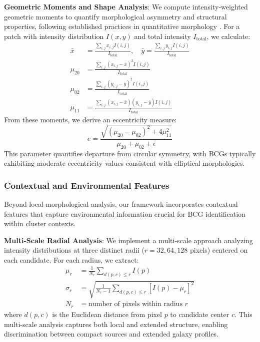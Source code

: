 \documentclass[twocolumn,10pt]{aastex631}
\begin{document}
\textbf{Geometric Moments and Shape Analysis}: We compute intensity-weighted geometric moments to quantify morphological asymmetry and structural properties, following established practices in quantitative morphology \citep{Hambleton2011}. For a patch with intensity distribution $I(x,y)$ and total intensity $I_{\text{total}}$, we calculate:
\begin{align}
\bar{x} &= \frac{\sum_{i,j} x_{i,j} I(i,j)}{I_{\text{total}}}, \quad \bar{y} = \frac{\sum_{i,j} y_{i,j} I(i,j)}{I_{\text{total}}} \\
\mu_{20} &= \frac{\sum_{i,j} (x_{i,j} - \bar{x})^2 I(i,j)}{I_{\text{total}}} \\
\mu_{02} &= \frac{\sum_{i,j} (y_{i,j} - \bar{y})^2 I(i,j)}{I_{\text{total}}} \\
\mu_{11} &= \frac{\sum_{i,j} (x_{i,j} - \bar{x})(y_{i,j} - \bar{y}) I(i,j)}{I_{\text{total}}}
\end{align}
From these moments, we derive an eccentricity measure:
\begin{equation}
e = \frac{\sqrt{(\mu_{20} - \mu_{02})^2 + 4\mu_{11}^2}}{\mu_{20} + \mu_{02} + \epsilon}
\end{equation}
This parameter quantifies departure from circular symmetry, with BCGs typically exhibiting moderate eccentricity values consistent with elliptical morphologies.

\subsubsection{Contextual and Environmental Features}

Beyond local morphological analysis, our framework incorporates contextual features that capture environmental information crucial for BCG identification within cluster contexts.

\textbf{Multi-Scale Radial Analysis}: We implement a multi-scale approach analyzing intensity distributions at three distinct radii ($r = 32, 64, 128$ pixels) centered on each candidate. For each radius, we extract:
\begin{align}
\mu_r &= \frac{1}{N_r} \sum_{d(p,c) \leq r} I(p) \\
\sigma_r &= \sqrt{\frac{1}{N_r-1} \sum_{d(p,c) \leq r} [I(p) - \mu_r]^2} \\
N_r &= \text{number of pixels within radius } r
\end{align}
where $d(p,c)$ is the Euclidean distance from pixel $p$ to candidate center $c$. This multi-scale analysis captures both local and extended structure, enabling discrimination between compact sources and extended galaxy profiles.
\end{document}
